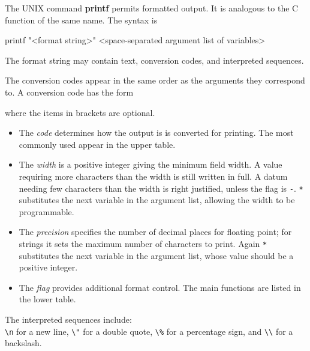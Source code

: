 \documentclass[twoside,11pt,nolof]{starlink}
\begin{document}
The UNIX command \textbf{printf} permits formatted output.  It is
analogous to the C function of the same name.  The syntax is

\begin{small}
\begin{terminalv}
     printf "<format string>" <space-separated argument list of variables>
\end{terminalv}
\end{small}

\begin{minipage}{73mm}
The format string may contain text, conversion codes, and interpreted
sequences.

The conversion codes appear in the same order as the arguments
they correspond to.  A conversion code has the form

\begin{small}
\begin{terminalv}
\end{terminalv}
\end{small}

where the items in brackets are optional.
\begin{itemize}
\item
The \emph{code} determines how the output is is converted for printing.
The most commonly used appear in the upper table.
\item
The \emph{width} is a positive integer giving the minimum field width.
A value requiring more characters than the width is still written in
full.  A datum needing few characters than the width is right
justified, unless the flag is \texttt{-}.  \texttt{*} substitutes the next
variable in the argument list, allowing the width to be programmable.
\item
The \emph{precision} specifies the number of decimal places for
floating point; for strings it sets the maximum number of characters
to print.  Again \texttt{*} substitutes the next variable in the argument
list, whose value should be a positive integer.
\item
The \emph{flag} provides additional format control.  The main functions
are listed in the lower table.
\end{itemize}

The interpreted sequences include:\\
\texttt{\textbackslash n} for a new line, \texttt{\textbackslash "} for a double quote,
\texttt{\textbackslash\%} for a percentage sign, and \texttt{\textbackslash\textbackslash} for a backslash.

\end{minipage}
\end{document}
